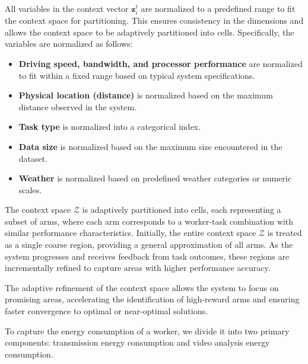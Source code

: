 All variables in the context vector $\mathbf{z}_i^t$ are normalized to a predefined range to fit the context space for partitioning. This ensures consistency in the dimensions and allows the context space to be adaptively partitioned into cells. Specifically, the variables are normalized as follows:
\begin{itemize}
    \item \textbf{Driving speed, bandwidth, and processor performance} are normalized to fit within a fixed range based on typical system specifications.
    \item \textbf{Physical location (distance)} is normalized based on the maximum distance observed in the system.
    \item \textbf{Task type} is normalized into a categorical index.
    \item \textbf{Data size} is normalized based on the maximum size encountered in the dataset.
    \item \textbf{Weather} is normalized based on predefined weather categories or numeric scales.
\end{itemize}

The context space $\mathcal{Z}$ is adaptively partitioned into cells, each representing a subset of arms, where each arm corresponds to a worker-task combination with similar performance characteristics. Initially, the entire context space $\mathcal{Z}$ is treated as a single coarse region, providing a general approximation of all arms. As the system progresses and receives feedback from task outcomes, these regions are incrementally refined to capture areas with higher performance accuracy.

The adaptive refinement of the context space allows the system to focus on promising areas, accelerating the identification of high-reward arms and ensuring faster convergence to optimal or near-optimal solutions.

To capture the energy consumption of a worker, we divide it into two primary components: transmission energy consumption and video analysis energy consumption.

